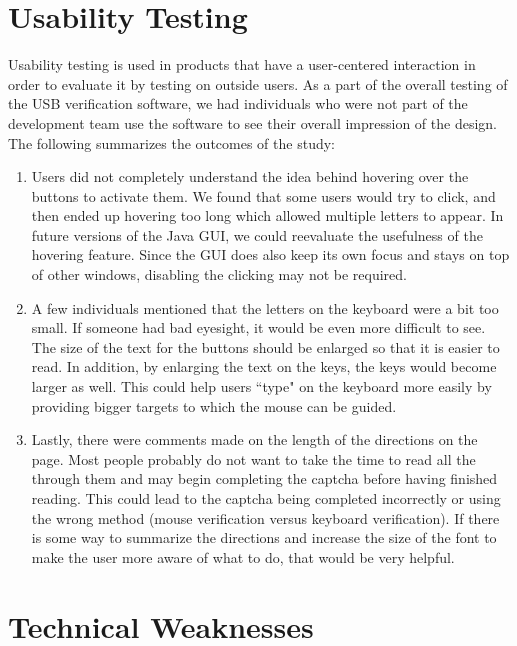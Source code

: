 \documentclass[pagenumbers]{ieee}
\begin{document}

\section{Usability Testing}
\label{section:usability}

Usability testing is used in products that have a user-centered interaction in order to evaluate it by testing on outside users. As a part of the overall testing of the USB verification software, we had individuals who were not part of the development team use the software to see their overall impression of the design. The following summarizes  the outcomes of the study:
\begin{enumerate}
\item Users did not completely understand the idea behind hovering over the buttons to activate them. We found that some users would try to click, and then ended up hovering too long which allowed multiple letters to appear. In future versions of the Java GUI, we could reevaluate the usefulness of the hovering feature. Since the GUI does also keep its own focus and stays on top of other windows, disabling the clicking may not be required. 
\item A few individuals mentioned that the letters on the keyboard were a bit too small. If someone had bad eyesight, it would be even more difficult to see. The size of the text for the buttons should be enlarged so that it is easier to read. In addition, by enlarging the text on the keys, the keys would become larger as well. This could help users ``type" on the keyboard more easily by providing bigger targets to which the mouse can be guided.
\item Lastly, there were comments made on the length of the directions on the page. Most people probably do not want to take the time to read all the through them and may begin completing the captcha before having finished reading. This could lead to the captcha being completed incorrectly or using the wrong method (mouse verification versus keyboard verification). If there is some way to summarize the directions and increase the size of the font to make the user more aware of what to do, that would be very helpful.
\end{enumerate}


\section{Technical Weaknesses}
\label{section:weakness}
\end{document}
